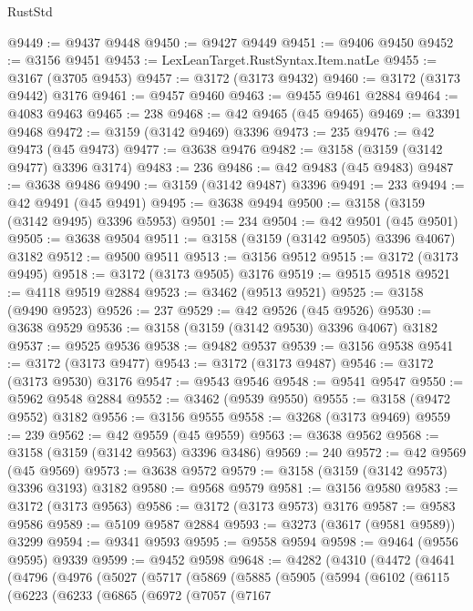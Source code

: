 \begin{lexlean}{RustStd}
\begin{coremodule}
@9449 := @9437 @9448
@9450 := @9427 @9449
@9451 := @9406 @9450
@9452 := @3156 @9451
@9453 := LexLeanTarget.RustSyntax.Item.natLe
@9455 := @3167 (@3705 @9453)
@9457 := @3172 (@3173 @9432)
@9460 := @3172 (@3173 @9442) @3176
@9461 := @9457 @9460
@9463 := @9455 @9461 @2884
@9464 := @4083 @9463
@9465 := 238
@9468 := @42 @9465 (@45 @9465)
@9469 := @3391 @9468
@9472 := @3159 (@3142 @9469) @3396
@9473 := 235
@9476 := @42 @9473 (@45 @9473)
@9477 := @3638 @9476
@9482 := @3158 (@3159 (@3142 @9477) @3396 @3174)
@9483 := 236
@9486 := @42 @9483 (@45 @9483)
@9487 := @3638 @9486
@9490 := @3159 (@3142 @9487) @3396
@9491 := 233
@9494 := @42 @9491 (@45 @9491)
@9495 := @3638 @9494
@9500 := @3158 (@3159 (@3142 @9495) @3396 @5953)
@9501 := 234
@9504 := @42 @9501 (@45 @9501)
@9505 := @3638 @9504
@9511 := @3158 (@3159 (@3142 @9505) @3396 @4067) @3182
@9512 := @9500 @9511
@9513 := @3156 @9512
@9515 := @3172 (@3173 @9495)
@9518 := @3172 (@3173 @9505) @3176
@9519 := @9515 @9518
@9521 := @4118 @9519 @2884
@9523 := @3462 (@9513 @9521)
@9525 := @3158 (@9490 @9523)
@9526 := 237
@9529 := @42 @9526 (@45 @9526)
@9530 := @3638 @9529
@9536 := @3158 (@3159 (@3142 @9530) @3396 @4067) @3182
@9537 := @9525 @9536
@9538 := @9482 @9537
@9539 := @3156 @9538
@9541 := @3172 (@3173 @9477)
@9543 := @3172 (@3173 @9487)
@9546 := @3172 (@3173 @9530) @3176
@9547 := @9543 @9546
@9548 := @9541 @9547
@9550 := @5962 @9548 @2884
@9552 := @3462 (@9539 @9550)
@9555 := @3158 (@9472 @9552) @3182
@9556 := @3156 @9555
@9558 := @3268 (@3173 @9469)
@9559 := 239
@9562 := @42 @9559 (@45 @9559)
@9563 := @3638 @9562
@9568 := @3158 (@3159 (@3142 @9563) @3396 @3486)
@9569 := 240
@9572 := @42 @9569 (@45 @9569)
@9573 := @3638 @9572
@9579 := @3158 (@3159 (@3142 @9573) @3396 @3193) @3182
@9580 := @9568 @9579
@9581 := @3156 @9580
@9583 := @3172 (@3173 @9563)
@9586 := @3172 (@3173 @9573) @3176
@9587 := @9583 @9586
@9589 := @5109 @9587 @2884
@9593 := @3273 (@3617 (@9581 @9589)) @3299
@9594 := @9341 @9593
@9595 := @9558 @9594
@9598 := @9464 (@9556 @9595) @9339
@9599 := @9452 @9598
@9648 := @4282
    (@4310
      (@4472
        (@4641
          (@4796
            (@4976
              (@5027
                (@5717
                  (@5869
                    (@5885
                      (@5905
                        (@5994
                          (@6102
                            (@6115
                              (@6223
                                (@6233
                                  (@6865
                                    (@6972
                                      (@7057
                                        (@7167

\end{coremodule}
\end{lexlean}

